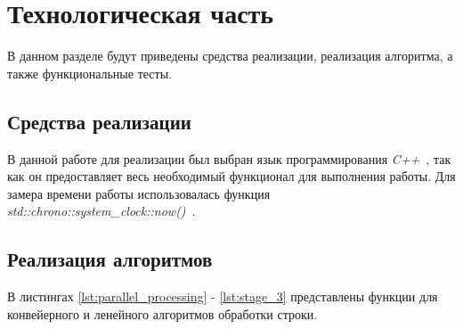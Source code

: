 \chapter{Технологическая часть}

В данном разделе будут приведены средства реализации, реализация алгоритма, а также функциональные тесты.


\section{Средства реализации}

В данной работе для реализации был выбран язык программирования \textit{C++}~\cite{bib2}, так как он предоставляет весь необходимый функционал для выполнения работы. 
Для замера времени работы использовалась функция \textit{std::chrono::system\_clock::now()}~\cite{bib3}.

\section{Реализация алгоритмов}

В листингах \ref{lst:parallel_processing} - \ref{lst:stage_3} представлены функции для конвейерного и ленейного алгоритмов обработки строки.

